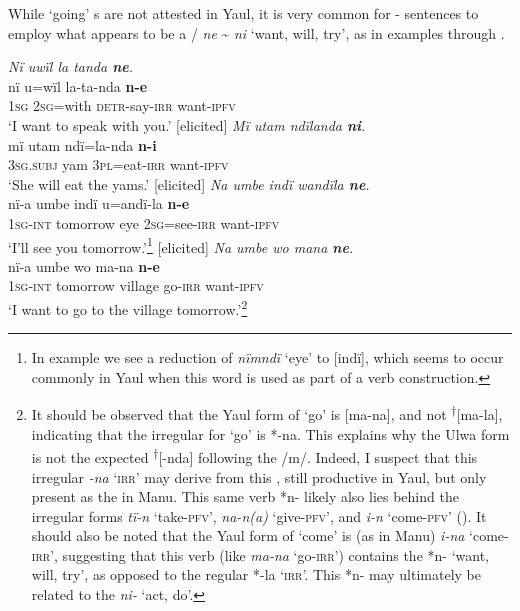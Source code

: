 While  ‘going’ s are not attested in Yaul, it is very common for - sentences to employ what appears to be a /  \textit{ne} {\textasciitilde} \textit{ni} ‘want, will, try’, as in examples  through .

\ea%
    \label{ex:mdy:12}
          \textit{Nï uwïl la tanda \textbf{ne}.}\\
    \gll nï    u=wïl    la-ta-nda    \textbf{n-e}\\
    1\textsc{sg}  2\textsc{sg}=with  \textsc{detr}{}-say-\textsc{irr}  want-\textsc{ipfv}\\
    \glt ‘I want to speak with you.’ [elicited]
\z
\ea%
    \label{ex:mdy:13}
          \textit{Mï utam ndïlanda \textbf{ni}.}\\
    \gll mï      utam  ndï=la-nda    \textbf{n-i}\\
    3\textsc{sg.subj}  yam  3\textsc{pl}=eat\textsc{{}-irr} want-\textsc{ipfv}\\
    \glt ‘She will eat the yams.’ [elicited]
\z
\ea%
    \label{ex:mdy:14}
          \textit{Na umbe indï wandïla \textbf{ne}.}\\
    \gll nï-a    umbe    indï  u=andï-la    \textbf{n-e}\\
    1\textsc{sg}{}-\textsc{int}  tomorrow  eye    2\textsc{sg}=see-\textsc{irr}  want-\textsc{ipfv}\\
    \glt ‘I’ll see you tomorrow.’\footnote{In example  we see a reduction of \textit{nïmndï} ‘eye’ to [indï], which seems to occur commonly in Yaul when this word is used as part of a  verb construction.} [elicited]
\z
\ea%
    \label{ex:mdy:15}
          \textit{Na umbe wo mana \textbf{ne}.}\\
    \gll nï-a    umbe    wo    ma-na  \textbf{n-e}\\
    1\textsc{sg}{}-\textsc{int}  tomorrow  village  go-\textsc{irr}  want-\textsc{ipfv}\\
    \glt ‘I want to go to the village tomorrow.’\footnote{It should be observed that the Yaul  form of ‘go’ is [ma-na], and not \textsuperscript{†}[ma-la], indicating that the  irregular   for ‘go’ is *-na. This explains why the Ulwa form is not the expected \textsuperscript{†}[-nda] following the  /m/. Indeed, I suspect that this irregular \textit{-na} ‘\textsc{irr}’  may derive from this  , still productive in Yaul, but only present as the   in Manu. This same verb *n- likely also lies behind the irregular  forms \textit{tï-n} ‘take-\textsc{pfv}’, \textit{na-n(a)} ‘give-\textsc{pfv}’, and \textit{i-n} ‘come-\textsc{pfv}’ (). It should also be noted that the Yaul  form of ‘come’ is (as in Manu) \textit{i-na} ‘come-\textsc{irr}’, suggesting that this verb (like \textit{ma-na} ‘go-\textsc{irr}’) contains the   *n- ‘want, will, try’, as opposed to the regular   *-la ‘\textsc{irr}’. This  *n- may ultimately be related to the  \textit{ni-} ‘act, do’.}
